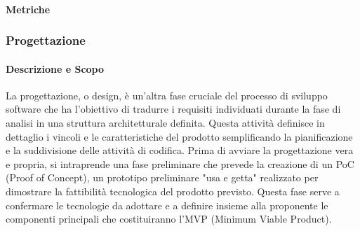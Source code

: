     \paragraph{Metriche}

\subsubsection{Progettazione}

    \paragraph{Descrizione e Scopo}     
    La progettazione, o design, è un'altra fase cruciale del processo di sviluppo software che ha l'obiettivo di tradurre i requisiti individuati durante la fase di analisi in una struttura architetturale definita. Questa attività definisce in dettaglio i vincoli e le caratteristiche del prodotto semplificando la pianificazione e la suddivisione delle attività di codifica.\newline
    Prima di avviare la progettazione vera e propria, si intraprende una fase preliminare che prevede la creazione di un PoC (Proof of Concept), un prototipo preliminare "usa e getta" realizzato per dimostrare la fattibilità tecnologica del prodotto previsto. Questa fase serve a confermare le tecnologie da adottare e a definire insieme alla proponente le componenti principali che costituiranno l'MVP (Minimum Viable Product).\\
    
